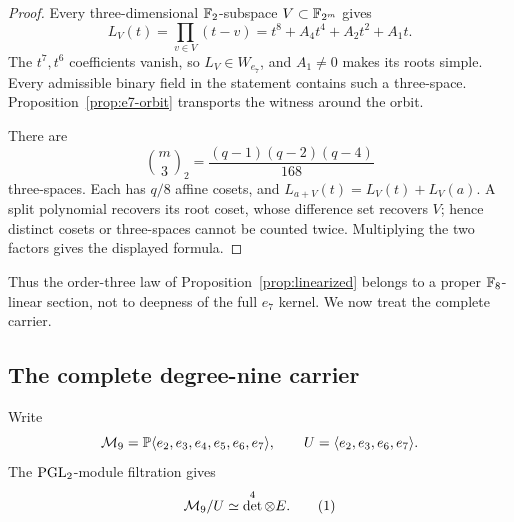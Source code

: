 \begin{proof}
Every three-dimensional $\mathbb F_2$-subspace $V\subset\mathbb F_{2^m}$ gives
\[
L_V(t)=\prod_{v\in V}(t-v)
      =t^8+A_4t^4+A_2t^2+A_1t.
\]
The $t^7,t^6$ coefficients vanish, so $L_V\in W_{e_7}$, and
$A_1\ne0$ makes its roots simple.  Every admissible binary
field in the statement contains such a three-space.
Proposition~\ref{prop:e7-orbit} transports the witness around the
orbit.

There are
\[
\binom m3_2=\frac{(q-1)(q-2)(q-4)}{168}
\]
three-spaces.  Each has $q/8$ affine cosets, and
$L_{a+V}(t)=L_V(t)+L_V(a)$.  A split polynomial recovers its root
coset, whose difference set recovers $V$; hence distinct cosets or
three-spaces cannot be counted twice.  Multiplying the two factors
gives the displayed formula.
\end{proof}

Thus the order-three law of Proposition~\ref{prop:linearized} belongs
to a proper $\mathbb F_8$-linear section, not to deepness of the full
$e_7$ kernel.  We now treat the complete carrier.

\subsection{The complete degree-nine carrier}

Write
\[
 \mathcal M_9=\mathbb P\langle e_2,e_3,e_4,e_5,e_6,e_7\rangle,\qquad
 U=\langle e_2,e_3,e_6,e_7\rangle .
\]
The $\operatorname{PGL}_2$-module filtration gives
\[
                    \cM_9/U\simeq\det^4\otimes E.
 \autoeqtag{eq:lucas-m9-quotient}
\]

